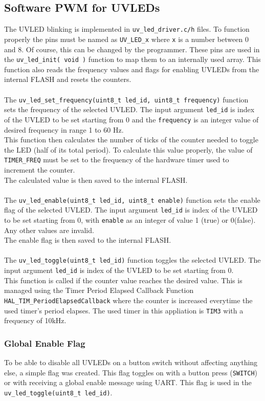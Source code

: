 \documentclass[12pt, a4paper]{article}
\begin{document}
\subsection{Software PWM for UVLEDs}
The UVLED blinking is implemented in \verb|uv_led_driver.c/h| files. To function properly the pins must be named as \verb|UV_LED_x| where \verb|x| is a number between 0 and 8. Of course, this can be changed by the programmer. These pins are used in the \verb|uv_led_init( void )| function to map them to an internally used array. This function also reads the frequency values and flags for enabling UVLEDs from the internal FLASH and resets the counters.\\
\\
The \verb|uv_led_set_frequency(uint8_t led_id, uint8_t frequency)| function sets the frequency of the selected UVLED. The input argument \verb|led_id| is index of the UVLED to be set starting from 0 and the \verb|frequency| is an integer value of desired frequency in range 1 to 60 Hz.\\
This function then calculates the number of ticks of the counter needed to toggle the LED (half of its total period). To calculate this value properly, the value of \verb|TIMER_FREQ| must be set to the frequency of the hardware timer used to increment the counter.\\
The calculated value is then saved to the internal FLASH.\\
\\
The \verb|uv_led_enable(uint8_t led_id, uint8_t enable)| function sets the enable flag of the selected UVLED. The input argument \verb|led_id| is index of the UVLED to be set starting from 0, with \verb|enable| as an integer of value 1 (true) or 0(false). Any other values are invalid.\\
The enable flag is then saved to the internal FLASH.\\
\\
The \verb|uv_led_toggle(uint8_t led_id)| function toggles the selected UVLED. The input argument \verb|led_id| is index of the UVLED to be set starting from 0.\\
This function is called if the counter value reaches the desired value. This is managed using the Timer Period Elapsed Callback Function \verb|HAL_TIM_PeriodElapsedCallback| where the counter is increased everytime the used timer's period elapses. The used timer in this appliation is \verb|TIM3| with a frequency of 10kHz.
\subsubsection{Global Enable Flag}
To be able to disable all UVLEDs on a button switch without affecting anything else, a simple flag was created. This flag toggles on with a button press (\verb|SWITCH|) or with receiving a global enable message using UART. This flag is used in the \verb|uv_led_toggle(uint8_t led_id)|.
\end{document}
